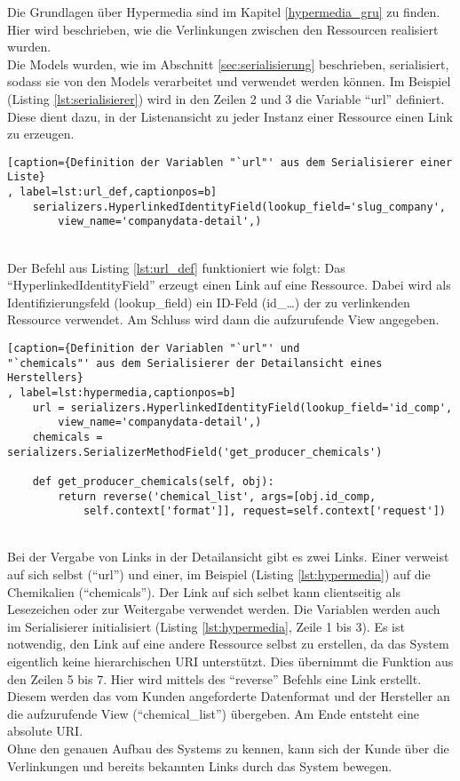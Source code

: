 Die Grundlagen über Hypermedia sind im Kapitel \ref{hypermedia_gru} zu finden.
Hier wird beschrieben, wie die Verlinkungen zwischen den Ressourcen realisiert
wurden.
\\
Die Models wurden, wie im Abschnitt \ref{sec:serialisierung} beschrieben,
serialisiert, sodass sie von den Models verarbeitet und verwendet werden
können. Im Beispiel (Listing \ref{lst:serialisierer}) wird in den Zeilen 2 und 3
die Variable "`url"' definiert. Diese dient dazu, in der Listenansicht zu
jeder Instanz einer Ressource einen Link zu erzeugen.
\begin{lstlisting}[caption={Definition der Variablen "`url"' aus dem Serialisierer einer Liste} 
, label=lst:url_def,captionpos=b] 
    serializers.HyperlinkedIdentityField(lookup_field='slug_company',
        view_name='companydata-detail',)
\end{lstlisting}
\\
Der Befehl aus Listing \ref{lst:url_def} funktioniert wie folgt:
Das "`HyperlinkedIdentityField"' erzeugt einen Link auf eine Ressource. Dabei
wird als Identifizierungsfeld (lookup\_field) ein ID-Feld (id\_\ldots)
der zu verlinkenden Ressource verwendet. Am Schluss wird dann die
aufzurufende View angegeben.
\begin{lstlisting}[caption={Definition der Variablen "`url"' und
"`chemicals"' aus dem Serialisierer der Detailansicht eines Herstellers} 
, label=lst:hypermedia,captionpos=b] 
    url = serializers.HyperlinkedIdentityField(lookup_field='id_comp',
        view_name='companydata-detail',)
    chemicals = serializers.SerializerMethodField('get_producer_chemicals')

    def get_producer_chemicals(self, obj):
        return reverse('chemical_list', args=[obj.id_comp, 
            self.context['format']], request=self.context['request'])
\end{lstlisting}
\\
Bei der Vergabe von Links in der Detailansicht gibt es zwei Links. Einer
verweist auf sich selbst ("`url"') und einer, im Beispiel (Listing
\ref{lst:hypermedia}) auf die Chemikalien ("`chemicals"'). Der Link auf sich
selbet kann clientseitig als Lesezeichen oder zur Weitergabe verwendet werden. Die Variablen werden auch im Serialisierer
initialisiert (Listing \ref{lst:hypermedia}, Zeile 1 bis 3). Es ist notwendig,
den Link auf eine andere Ressource selbst zu erstellen, da das System eigentlich
keine hierarchischen \ac{URI} unterstützt. Dies übernimmt die Funktion aus den
Zeilen 5 bis 7. Hier wird mittels des "`reverse"' Befehls eine Link erstellt.
Diesem werden das vom Kunden angeforderte Datenformat und der Hersteller an
die aufzurufende View ("`chemical\_list"') übergeben. Am Ende entsteht eine absolute \ac{URI}.
\\
Ohne den genauen Aufbau des Systems zu kennen, kann sich der Kunde über die
Verlinkungen und bereits bekannten Links durch das System bewegen.

